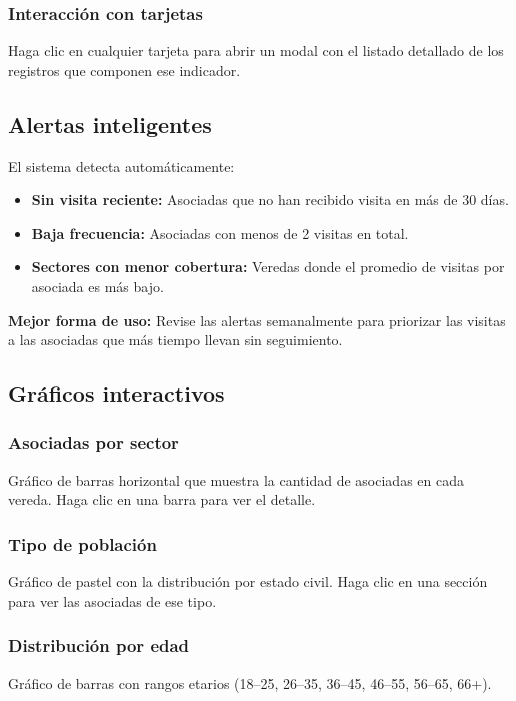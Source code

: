 \documentclass[12pt]{article}
\begin{document}
\subsubsection{Interacción con tarjetas}
Haga clic en cualquier tarjeta para abrir un modal con el listado detallado de los registros que componen ese indicador.

\subsection{Alertas inteligentes}
El sistema detecta automáticamente:
\begin{itemize}[nosep]
  \item \textbf{Sin visita reciente:} Asociadas que no han recibido visita en más de 30 días.
  \item \textbf{Baja frecuencia:} Asociadas con menos de 2 visitas en total.
  \item \textbf{Sectores con menor cobertura:} Veredas donde el promedio de visitas por asociada es más bajo.
\end{itemize}

\begin{tipbox}
  \textbf{Mejor forma de uso:} Revise las alertas semanalmente para priorizar las visitas a las asociadas que más tiempo llevan sin seguimiento.
\end{tipbox}

\subsection{Gráficos interactivos}

\subsubsection{Asociadas por sector}
Gráfico de barras horizontal que muestra la cantidad de asociadas en cada vereda. Haga clic en una barra para ver el detalle.

\subsubsection{Tipo de población}
Gráfico de pastel con la distribución por estado civil. Haga clic en una sección para ver las asociadas de ese tipo.

\subsubsection{Distribución por edad}
Gráfico de barras con rangos etarios (18--25, 26--35, 36--45, 46--55, 56--65, 66+).
\end{document}
